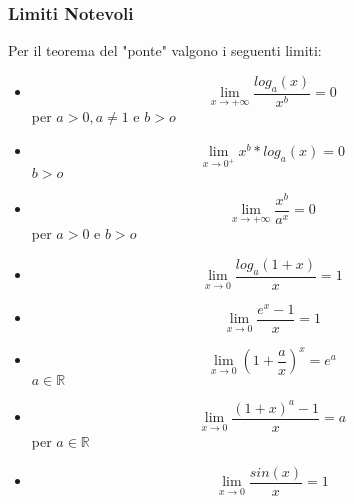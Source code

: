 \documentclass{article}
\begin{document}
        \subsubsection{Limiti Notevoli}
        \begin{flushleft}
            Per il teorema del "ponte" valgono i seguenti limiti:
            \begin{itemize}
                \item \begin{equation}
                        \lim_{x \to +\infty} \frac{log_a(x)}{x^b}=0
                \end{equation} per $a>0, a \neq 1$ e $b>o$
                \item \begin{equation}
                        \lim_{x \to 0^+} x^b*log_a(x)=0
                \end{equation} $b>o$
                \item \begin{equation}
                        \lim_{x \to +\infty} \frac{x^b}{a^x}=0
                \end{equation} per $a>0$ e $b>o$
                \item \begin{equation}
                        \lim_{x \to 0} \frac{log_a(1+x)}{x}=1
                \end{equation}
                \item \begin{equation}
                        \lim_{x \to 0} \frac{e^x-1}{x}=1
                \end{equation}
                \item \begin{equation}
                        \lim_{x \to 0} (1+\frac{a}{x})^x=e^a
                \end{equation} $a\in \mathbb{R}$
                \item \begin{equation}
                        \lim_{x \to 0} \frac{(1+x)^a-1}{x}=a
                \end{equation} per $a\in \mathbb{R}$
                \item \begin{equation}
                        \lim_{x \to 0} \frac{sin(x)}{x}=1
                \end{equation}
            \end{itemize}
        \end{flushleft}
\end{document}
